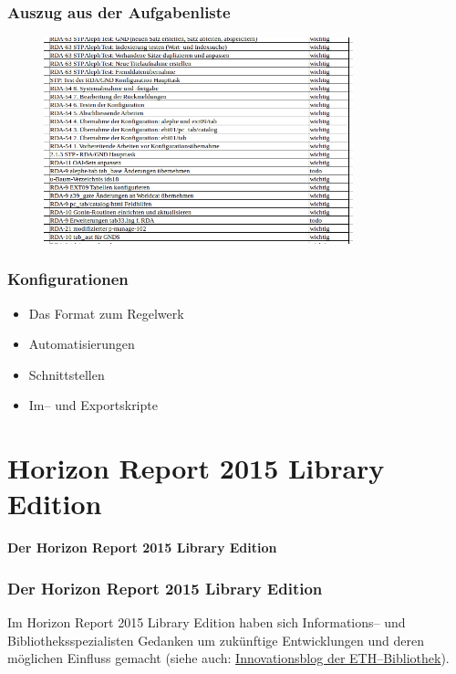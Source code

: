 \begin{frame}[c]\frametitle{Auszug aus der Aufgabenliste}
  \begin{figure}
    \begin{center}
      \includegraphics[width=0.8\textwidth]{pics/rda-liste}
    \end{center}
  \end{figure}
\end{frame}

\begin{frame}[c]\frametitle{Konfigurationen}  
  \begin{itemize}
    \item Das Format zum Regelwerk
    \item Automatisierungen
    \item Schnittstellen
    \item Im-- und Exportskripte
  \end{itemize}
\end{frame}

\section{Horizon Report 2015 Library Edition}
\begin{frame}[c]
\begin{center}
  \textbf{Der Horizon Report 2015 Library Edition}
\end{center}
\end{frame}

\begin{frame}[c]\frametitle{Der Horizon Report 2015 Library Edition}
    Im Horizon Report 2015 Library Edition haben sich Informations-- und Bibliotheksspezialisten Gedanken um zukünftige Entwicklungen und deren möglichen Einfluss gemacht (siehe auch: \href{http://blogs.ethz.ch/innovethbib/2015/08/24/horizon-report-2015-library-edition/}{Innovationsblog der ETH--Bibliothek}).
\end{frame}
  

